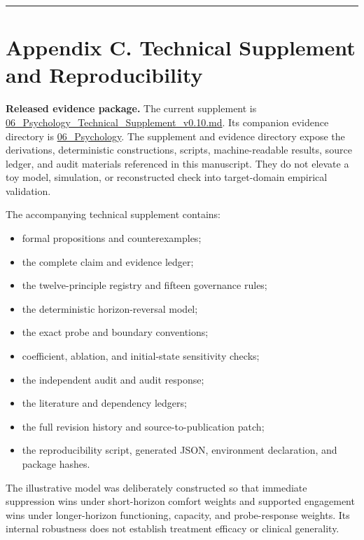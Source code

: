 \documentclass[
  11pt,
]{article}
\providecommand{\tightlist}{%
  \setlength{\itemsep}{0pt}\setlength{\parskip}{0pt}}
\begin{document}
\begin{center}\rule{0.5\linewidth}{0.5pt}\end{center}

\section{Appendix C. Technical Supplement and
Reproducibility}\label{appendix-c.-technical-supplement-and-reproducibility}

\textbf{Released evidence package.} The current supplement is
\href{../supplements/06_Psychology_Technical_Supplement_v0.10.md}{06\_Psychology\_Technical\_Supplement\_v0.10.md}.
Its companion evidence directory is
\href{../evidence/06_Psychology/README.md}{06\_Psychology}. The
supplement and evidence directory expose the derivations, deterministic
constructions, scripts, machine-readable results, source ledger, and
audit materials referenced in this manuscript. They do not elevate a toy
model, simulation, or reconstructed check into target-domain empirical
validation.

The accompanying technical supplement contains:

\begin{itemize}
\tightlist
\item
  formal propositions and counterexamples;
\item
  the complete claim and evidence ledger;
\item
  the twelve-principle registry and fifteen governance rules;
\item
  the deterministic horizon-reversal model;
\item
  the exact probe and boundary conventions;
\item
  coefficient, ablation, and initial-state sensitivity checks;
\item
  the independent audit and audit response;
\item
  the literature and dependency ledgers;
\item
  the full revision history and source-to-publication patch;
\item
  the reproducibility script, generated JSON, environment declaration,
  and package hashes.
\end{itemize}

The illustrative model was deliberately constructed so that immediate
suppression wins under short-horizon comfort weights and supported
engagement wins under longer-horizon functioning, capacity, and
probe-response weights. Its internal robustness does not establish
treatment efficacy or clinical generality.
\end{document}
